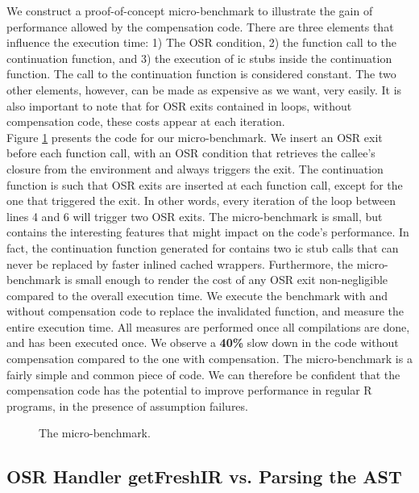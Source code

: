 We construct a proof-of-concept micro-benchmark to illustrate the gain of performance allowed by the compensation code. 
There are three elements that influence the execution time: 1) The OSR condition, 2) the function call to the continuation function, and 3) the execution of ic stubs inside the continuation function.
The call to the continuation function is considered constant.
The two other elements, however, can be made as expensive as we want, very easily.
It is also important to note that for OSR exits contained in loops, without compensation code, these costs appear at each iteration.\\

Figure \ref{fig:microbenchmark} presents the code for our micro-benchmark. 
We insert an OSR exit before each function call, with an OSR condition that retrieves the callee's closure from the environment and always triggers the exit.
The continuation function is such that OSR exits are inserted at each function call, except for the one that triggered the exit.
In other words, every iteration of the loop between lines 4 and 6 will trigger two OSR exits.
The micro-benchmark is small, but contains the interesting features that might impact on the code's performance.
In fact, the continuation function generated for  contains two ic stub calls that can never be replaced by faster inlined cached wrappers.
Furthermore, the micro-benchmark is small enough to render the cost of any OSR exit non-negligible compared to the overall execution time.
We execute the benchmark with and without compensation code to replace the invalidated function, and measure the entire execution time.
All measures are performed once all compilations are done, and  has been executed once.
We observe a \textbf{40\%} slow down in the code without compensation compared to the one with compensation.
The micro-benchmark is a fairly simple and common piece of code.
We can therefore be confident that the compensation code has the potential to improve performance in regular R programs, in the presence of assumption failures.
\\

\begin{figure}[h]
\caption{The micro-benchmark.}
\label{fig:microbenchmark}
\end{figure}


\subsection{OSR Handler getFreshIR vs. Parsing the AST}\label{section:getfreshtest}

